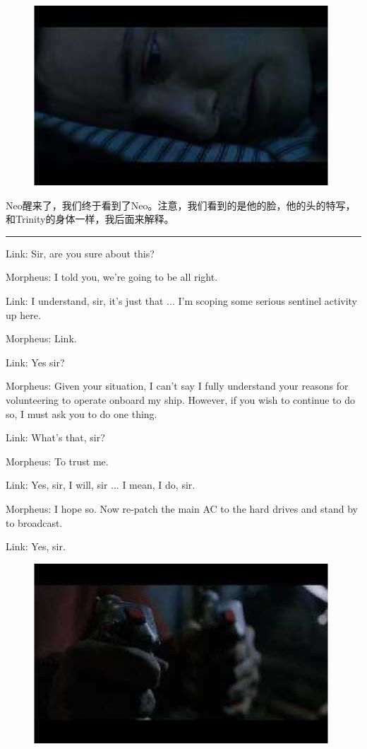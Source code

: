 \documentclass[UTF8]{ctexart}
\newcommand{\myparsep}{\noindent \rule[0.5ex]{\linewidth}{1pt}}
\newenvironment{myquote}{\color{green} \setlength{\leftskip}{6em} \setlength{\rightskip}{4em} \setlength{\parindent}{-2em}}{\par}
\begin{document}
\begin{figure}[htb]
\centering
\includegraphics[width=0.5\linewidth]{fig/read_reloaded-11}
\end{figure}

Neo醒来了，我们终于看到了Neo。注意，我们看到的是他的脸，他的头的特写，和Trinity的身体一样，我后面来解释。

\myparsep

\begin{myquote}
Link: Sir, are you sure about this?

Morpheus: I told you, we're going to be all right.

Link: I understand, sir, it's just that ... I'm scoping some serious sentinel activity up here.

Morpheus: Link.

Link: Yes sir?

Morpheus: Given your situation, I can't say I fully understand your reasons for volunteering to operate onboard my ship. However, if you wish to continue to do so, I must ask you to do one thing.

Link: What's that, sir?

Morpheus: To trust me.

Link: Yes, sir, I will, sir ... I mean, I do, sir.

Morpheus: I hope so. Now re-patch the main AC to the hard drives and stand by to broadcast.

Link: Yes, sir.
\end{myquote}

\begin{figure}[htb]
\centering
\includegraphics[width=0.5\linewidth]{fig/read_reloaded-12}
\end{figure}
\end{document}
